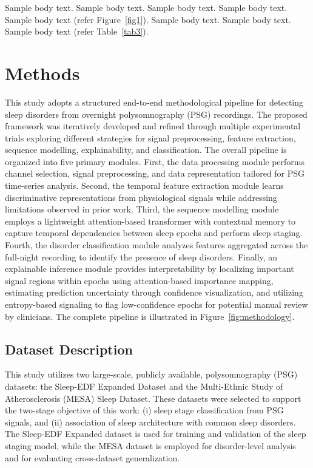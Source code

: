 \documentclass[pdflatex,sn-mathphys-num]{sn-jnl}%
\theoremstyle{thmstyleone}%
\theoremstyle{thmstyletwo}%
\theoremstyle{thmstylethree}%
\begin{document}
Sample body text. Sample body text. Sample body text. Sample body text. Sample body text (refer Figure~\ref{fig1}). Sample body text. Sample body text. Sample body text (refer Table~\ref{tab3}). 

\section{Methods}\label{sec11}

This study adopts a structured end-to-end methodological pipeline for detecting sleep disorders from overnight polysomnography (PSG) recordings. The proposed framework was iteratively developed and refined through multiple experimental trials exploring different strategies for signal preprocessing, feature extraction, sequence modelling, explainability, and classification. The overall pipeline is organized into five primary modules. First, the data processing module performs channel selection, signal preprocessing, and data representation tailored for PSG time-series analysis. Second, the temporal feature extraction module learns discriminative representations from physiological signals while addressing limitations observed in prior work. Third, the sequence modelling module employs a lightweight attention-based transformer with contextual memory to capture temporal dependencies between sleep epochs and perform sleep staging. Fourth, the disorder classification module analyzes features aggregated across the full-night recording to identify the presence of sleep disorders. Finally, an explainable inference module provides interpretability by localizing important signal regions within epochs using attention-based importance mapping, estimating prediction uncertainty through confidence visualization, and utilizing entropy-based signaling to flag low-confidence epochs for potential manual review by clinicians. The complete pipeline is illustrated in Figure~\ref{fig:methodology}.

\subsection{Dataset Description}
This study utilizes two large-scale, publicly available, polysomnography (PSG) datasets: the Sleep-EDF Expanded Dataset\cite{sleepedfx, physiobank} and the Multi-Ethnic Study of Atherosclerosis (MESA) Sleep Dataset\cite{mesa, nsrr}. These datasets were selected to support the two-stage objective of this work: (i)  sleep stage classification from PSG signals, and (ii) association of sleep architecture with common sleep disorders. The Sleep-EDF Expanded dataset is used for training and validation of the sleep staging model, while the MESA dataset is employed for disorder-level analysis and for evaluating cross-dataset generalization.
\end{document}
